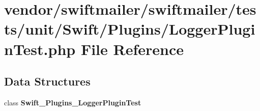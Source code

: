 \section{vendor/swiftmailer/swiftmailer/tests/unit/\+Swift/\+Plugins/\+Logger\+Plugin\+Test.php File Reference}
\label{_logger_plugin_test_8php}
\subsection*{Data Structures}
\begin{DoxyCompactItemize}
\item 
class {\bf Swift\+\_\+\+Plugins\+\_\+\+Logger\+Plugin\+Test}
\end{DoxyCompactItemize}
